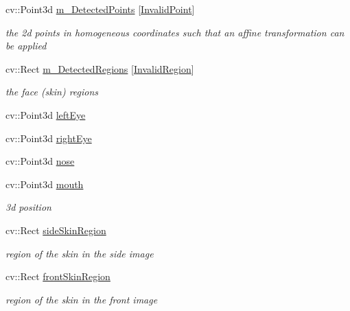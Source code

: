 \begin{DoxyCompactItemize}
\item 
cv\+::\+Point3d \hyperlink{class_face3_d_1_1_face_geometry_a695d2f7b17ed80f56f4e6af44c796a9a}{m\+\_\+\+Detected\+Points} \mbox{[}\hyperlink{class_face3_d_1_1_face_geometry_aab597f00966010882927a4974649bf11aef08736c0cf92fe26e5d281571ac319d}{Invalid\+Point}\mbox{]}
\begin{DoxyCompactList}\small\item\em the 2d points in homogeneous coordinates such that an affine transformation can be applied \end{DoxyCompactList}\item 
cv\+::\+Rect \hyperlink{class_face3_d_1_1_face_geometry_a41bdb9ec230523b1bc19bc8f7f2b48ea}{m\+\_\+\+Detected\+Regions} \mbox{[}\hyperlink{class_face3_d_1_1_face_geometry_a6db32685a7f429d507b8e31f7c42fe77ac1c1cfae295c068738737d0bdbd3cb78}{Invalid\+Region}\mbox{]}
\begin{DoxyCompactList}\small\item\em the face (skin) regions \end{DoxyCompactList}\item 
cv\+::\+Point3d \hyperlink{class_face3_d_1_1_face_geometry_a67446b08935c867d465743452d674f71}{left\+Eye}
\item 
cv\+::\+Point3d \hyperlink{class_face3_d_1_1_face_geometry_a2843e84aaa697a4cd418d1940378955b}{right\+Eye}
\item 
cv\+::\+Point3d \hyperlink{class_face3_d_1_1_face_geometry_a51b5cf29a6deac13aad7ab3ba3858eca}{nose}
\item 
cv\+::\+Point3d \hyperlink{class_face3_d_1_1_face_geometry_a1c36fe81650a276b523d8dc17b30038e}{mouth}
\begin{DoxyCompactList}\small\item\em 3d position \end{DoxyCompactList}\item 
cv\+::\+Rect \hyperlink{class_face3_d_1_1_face_geometry_a50fd03eb7de07088b36d3e4dea286b94}{side\+Skin\+Region}
\begin{DoxyCompactList}\small\item\em region of the skin in the side image \end{DoxyCompactList}\item 
cv\+::\+Rect \hyperlink{class_face3_d_1_1_face_geometry_aec3c5ac2a67745348df5aa68651bf616}{front\+Skin\+Region}
\begin{DoxyCompactList}\small\item\em region of the skin in the front image \end{DoxyCompactList}\end{DoxyCompactItemize}


